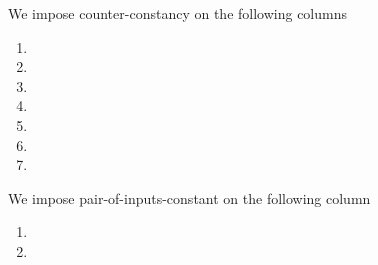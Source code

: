 We impose counter-constancy on the following columns
\begin{multicols}{3}
    \begin{enumerate}
        \item \maxCt{}
        \item \isInfinity{}
        \item \accInputs{}
        \item \trivialAcc{}
        \item \membershipTestRequired{}
        \item \malformedDataBit{}
        \item \malformedDataAcc{}
    \end{enumerate}
\end{multicols}
We impose pair-of-inputs-constant on the following column
\begin{multicols}{3}
    \begin{enumerate}
        \item \acceptablePairOfPoints{}
        \item \pairOfPointsContainsInfinity{}
    \end{enumerate}
\end{multicols}
